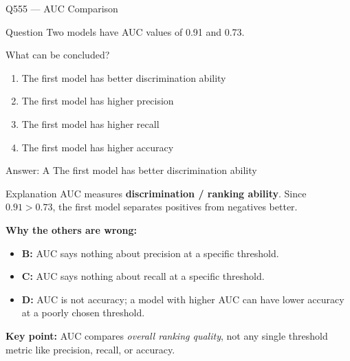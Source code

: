 \documentclass[aspectratio=169,8pt]{beamer}
\begin{document}
	\begin{frame}{Q555 --- AUC Comparison}
		\begin{block}{Question}
			Two models have AUC values of 0.91 and 0.73.
			
			What can be concluded?
			\begin{enumerate}
				\item The first model has better discrimination ability
				\item The first model has higher precision
				\item The first model has higher recall
				\item The first model has higher accuracy
			\end{enumerate}
		\end{block}
		
		\begin{exampleblock}{Answer: A}
			The first model has better discrimination ability
		\end{exampleblock}
		
		\begin{block}{Explanation}
			AUC measures \textbf{discrimination / ranking ability}. Since
			\(0.91 > 0.73\), the first model separates positives from negatives better.
			
			\textbf{Why the others are wrong:}
			\begin{itemize}
				\item \textbf{B:} AUC says nothing about precision at a specific threshold.
				\item \textbf{C:} AUC says nothing about recall at a specific threshold.
				\item \textbf{D:} AUC is not accuracy; a model with higher AUC can have
				lower accuracy at a poorly chosen threshold.
			\end{itemize}
			
			\textbf{Key point:} AUC compares \emph{overall ranking quality}, not any single
			threshold metric like precision, recall, or accuracy.
		\end{block}
	\end{frame}
	
\end{document}
